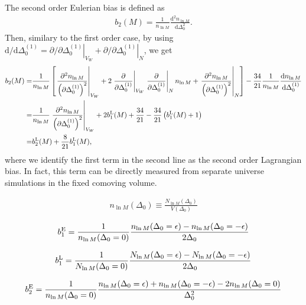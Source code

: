 \documentclass[a4paper,11pt]{article}
\renewcommand{\d}{\mathrm{d}}
\begin{document}
The second order Eulerian bias is defined as
\begin{align}
b_2(M) = \frac{1}{n_{\ln{M}}}\frac{\d^2 n_{\ln{M}}}{\d \Delta_0^2}.
\end{align}
Then, similary to the first order case, by using
$ \d/\d\Delta_0^{(1)}=
\left.\partial/\partial\Delta_0^{(1)}\right|_{V_W}
+\left.\partial/\partial\Delta_0^{(1)}\right|_{N}$,
we get
\begin{align}
b_2(M)
=&\frac{1}{n_{\ln{M}}}
\left[ \left.\frac{\partial^2 n_{\ln{M}} }{\left(\partial \Delta_0^{(1)}\right)^2}\right|_{V_W}
+ 2 \left.\frac{\partial}{\partial \Delta_0^{(1)}}\right|_{V_W}
\left.\frac{\partial}{\partial \Delta_0^{(1)}}\right|_{N}n_{\ln{M}}
+ \left.\frac{\partial^2 n_{\ln{M}}  }{\left(\partial \Delta_0^{(1)}\right)^2}\right|_{N} \right]
-\frac{34}{21}
\frac{1}{n_{\ln{M}}}
\frac{\d n_{\ln{M}}}{\d \Delta_0^{(1)} }
\nonumber\\
=&\frac{1}{n_{\ln{M}}}\left.\frac{\partial^2 n_{\ln{M}} }{\left(\partial \Delta_0^{(1)}\right)^2}\right|_{V_W}
+2b_1^{\rm L}(M) + \frac{34}{21}
- \frac{34}{21}\left( b_1^{\rm L}(M) + 1 \right)
\nonumber\\
=&b_2^{\rm L}(M) + \frac{8}{21}b_1^{\rm L}(M),
\end{align}
where we identify the first term in the second line as the second order Lagrangian bias.
In fact, this term can be directly measured from separate universe simulations in the fixed comoving volume.

\begin{align}
n_{\ln{M}}(\Delta_{0}) \equiv
\frac{N_{\ln{M}}(\Delta_{0})}{V(\Delta_{0})}
\end{align}

\begin{align}
b^{\rm E}_{1}
= \frac{1}{n_{\ln{M}}(\Delta_0=0)}
\frac{n_{\ln{M}}(\Delta_0=\epsilon)
-
n_{\ln{M}}(\Delta_0=-\epsilon)
}{2\Delta_0}
\end{align}


\begin{align}
b^{\rm L}_{1}
= \frac{1}{N_{\ln{M}}(\Delta_0=0)}
\frac{N_{\ln{M}}(\Delta_0=\epsilon)
-
N_{\ln{M}}(\Delta_0=-\epsilon)
}{2\Delta_0}
\end{align}


\begin{align}
b^{\rm E}_{2}
= \frac{1}{n_{\ln{M}}(\Delta_0=0)}
\frac{n_{\ln{M}}(\Delta_0=\epsilon)
+
n_{\ln{M}}(\Delta_0=-\epsilon)
-2n_{\ln{M}}(\Delta_0=0)}{\Delta^2_0}
\end{align}
\end{document}

